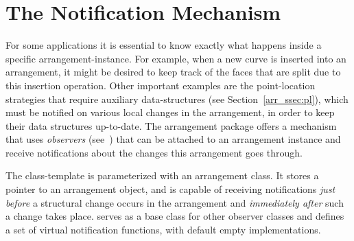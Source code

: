 \section{The Notification Mechanism}
\label{arr_sec:notif}

For some applications it is essential to know exactly what
happens inside a specific arrangement-instance. For example, when
a new curve is inserted into an arrangement, it might be desired to keep
track of the faces that are split due to this insertion operation.
Other important examples are the point-location strategies that
require auxiliary data-structures (see Section~\ref{arr_ssec:pl}),
which must be notified on various local changes in the arrangement,
in order to keep their data structures up-to-date. The arrangement
package offers a mechanism that uses {\em observers} 
(see~\cite{cgal:ghjv-dpero-95}) that can be
attached to an arrangement instance and receive notifications
about the changes this arrangement goes through.

The  class-template is
parameterized with an arrangement class. It stores a pointer to an
arrangement object, and is capable of receiving notifications {\em
just before} a structural change occurs in the arrangement and
{\em immediately after} such a change takes place.
 serves as a base class for other observer
classes and defines a set of virtual notification functions,
with default empty implementations.

